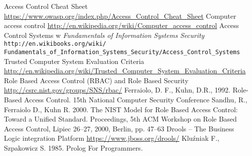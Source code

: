\documentclass{classrep}
\begin{document}
\begin{thebibliography}{10}
Access Control Cheat Sheet \url{https://www.owasp.org/index.php/Access\_Control\_Cheat\_Sheet}
Computer access control \url{http://en.wikipedia.org/wiki/Computer\_access\_control}
Access Control Systems w \textsl{Fundamentals of Information Systems Security} \texttt{http://en.wikibooks.org/wiki/\\Fundamentals\_of\_Information\_Systems\_Security/Access\_Control\_Systems}
Trusted Computer System Evaluation Criteria \url{http://en.wikipedia.org/wiki/Trusted\_Computer\_System\_Evaluation\_Criteria}
Role Based Access Control (RBAC) and Role Based Security \url{http://csrc.nist.gov/groups/SNS/rbac/}
Ferraiolo, D. F., Kuhn, D.R., 1992. Role-Based Access Control. 15th National Computer Security Conference
Sandhu, R., Ferraiolo D., Kuhn R. 2000. The NIST Model for  Role Based Access Control:  Toward a Unified Standard. 
Proceedings, 5th ACM Workshop on Role Based Access Control, Lipiec 26--27, 2000, Berlin, pp. 47--63 
Drools -- The Business Logic integration Platform \url{https://www.jboss.org/drools/}
Kluźniak F., Szpakowicz S. 1985. Prolog For Programmers.
\end{thebibliography}
\end{document}
